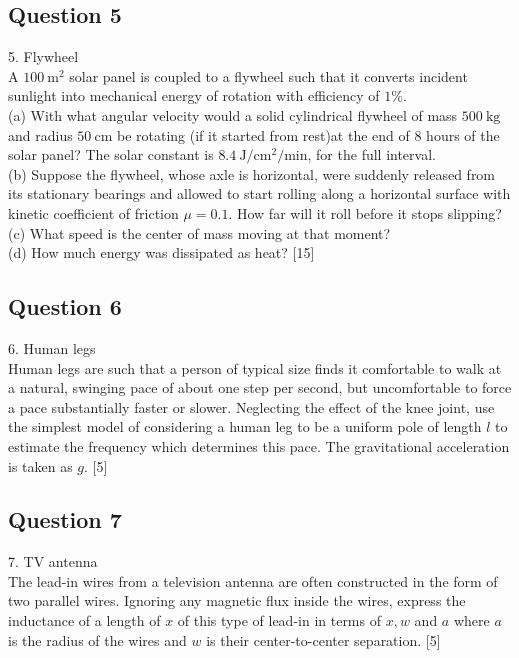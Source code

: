 \documentclass{article}
\begin{document}
\subsection{Question 5}
5. Flywheel \\
A $100 \mathrm{~m}^{2}$ solar panel is coupled to a flywheel such that it converts incident sunlight into mechanical energy of rotation with efficiency of $1 \%$. \\
(a) With what angular velocity would a solid cylindrical flywheel of mass $500 \mathrm{~kg}$ and radius $50 \mathrm{~cm}$ be rotating (if it started from rest)at the end of 8 hours of the solar panel? The solar constant is $8.4 \mathrm{~J} / \mathrm{cm}^{2} / \mathrm{min}$, for the full interval. \\
(b) Suppose the flywheel, whose axle is horizontal, were suddenly released from its stationary bearings and allowed to start rolling along a horizontal surface with kinetic coefficient of friction $\mu=0.1$. How far will it roll before it stops slipping? \\
(c) What speed is the center of mass moving at that moment? \\
(d) How much energy was dissipated as heat? [15] \\

\subsection{Question 6}
6. Human legs \\
Human legs are such that a person of typical size finds it comfortable to walk at a natural, swinging pace of about one step per second, but uncomfortable to force a pace substantially faster or slower. Neglecting the effect of the knee joint, use the simplest model of considering a human leg to be a uniform pole of length $l$ to estimate the frequency which determines this pace. The gravitational acceleration is taken as $g$. [5] 

\subsection{Question 7} 
7. TV antenna \\ The lead-in wires from a television antenna are often constructed in the form of two parallel wires. Ignoring any magnetic flux inside the wires, express the inductance of a length of $x$ of this type of lead-in in terms of $x, w$ and $a$ where $a$ is the radius of the wires and $w$ is their center-to-center separation. [5]
\end{document}
